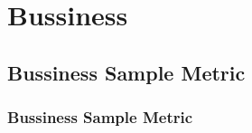 \chapter{Bussiness}


\clearpage
\thispagestyle{clusteringstyle}
\section{Bussiness Sample Metric}
\subsection{Bussiness Sample Metric}